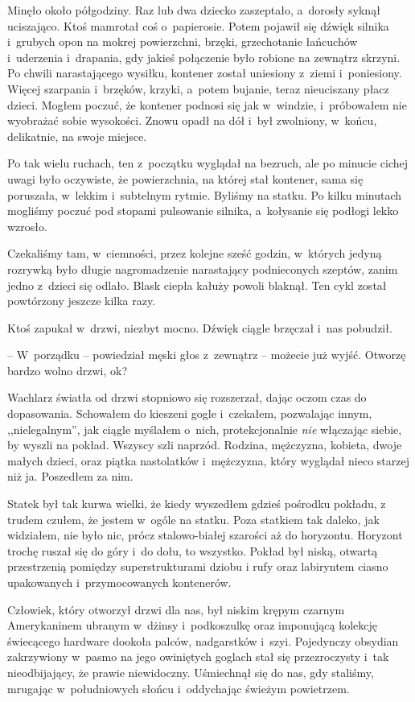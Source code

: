 \documentclass[oneside,polish,12pt,sfheadings]{mwbk}
\begin{document}
Minęło około półgodziny. Raz lub dwa dziecko zaszeptało, a~dorosły
syknął uciszająco. Ktoś mamrotał coś o~papierosie. Potem pojawił się
dźwięk silnika i~grubych opon na mokrej powierzchni, brzęki,
grzechotanie łańcuchów i~uderzenia i~drapania, gdy jakieś połączenie
było robione na zewnątrz skrzyni. Po chwili narastającego wysiłku,
kontener został uniesiony z~ziemi i~poniesiony. Więcej szarpania i~brzęków, krzyki, a~potem bujanie, teraz nieuciszany płacz dzieci. Mogłem
poczuć, że kontener podnosi się jak w~windzie, i~próbowałem nie
wyobrażać sobie wysokości. Znowu opadł na dół i~był zwolniony, w~końcu,
delikatnie, na swoje miejsce.

Po tak wielu ruchach, ten z~początku wyglądał na bezruch, ale po minucie
cichej uwagi było oczywiste, że powierzchnia, na której stał kontener,
sama się poruszała, w~lekkim i~subtelnym rytmie. Byliśmy na statku. Po
kilku minutach mogliśmy poczuć pod stopami pulsowanie silnika, a~kołysanie się podłogi lekko wzrosło.

Czekaliśmy tam, w~ciemności, przez kolejne sześć godzin, w~których
jedyną rozrywką było długie nagromadzenie narastający podnieconych
szeptów, zanim jedno z~dzieci się odlało. Blask ciepła kałuży powoli
blaknął. Ten cykl został powtórzony jeszcze kilka razy.

Ktoś zapukał w~drzwi, niezbyt mocno. Dźwięk ciągle brzęczał i~nas
pobudził.

-- W~porządku -- powiedział męski głos z~zewnątrz -- możecie już wyjść.
Otworzę bardzo wolno drzwi, ok?

Wachlarz światła od drzwi stopniowo się rozszerzał, dając oczom czas do
dopasowania. Schowałem do kieszeni gogle i~czekałem, pozwalając innym,
,,nielegalnym'', jak ciągle myślałem o~nich, protekcjonalnie \emph{nie}
włączając siebie, by wyszli na pokład. Wszyscy szli naprzód. Rodzina,
mężczyzna, kobieta, dwoje małych dzieci, oraz piątka nastolatków i~mężczyzna, który wyglądał nieco starzej niż ja. Poszedłem za nim.

Statek był tak kurwa wielki, że kiedy wyszedłem gdzieś pośrodku pokładu,
z trudem czułem, że jestem w~ogóle na statku. Poza statkiem tak daleko,
jak widziałem, nie było nic, prócz stalowo-białej szarości aż do
horyzontu. Horyzont trochę ruszał się do góry i~do dołu, to wszystko.
Pokład był niską, otwartą przestrzenią pomiędzy superstrukturami dziobu
i rufy oraz labiryntem ciasno upakowanych i~przymocowanych kontenerów.

Człowiek, który otworzył drzwi dla nas, był niskim krępym czarnym
Amerykaninem ubranym w~dżinsy i~podkoszulkę oraz imponującą kolekcję
świecącego hardware dookoła palców, nadgarstków i~szyi. Pojedynczy
obsydian zakrzywiony w~pasmo na jego owiniętych goglach stał się
przezroczysty i~tak nieodbijający, że prawie niewidoczny. Uśmiechnął się
do nas, gdy staliśmy, mrugając w~południowych słońcu i~oddychając
świeżym powietrzem.
\end{document}
